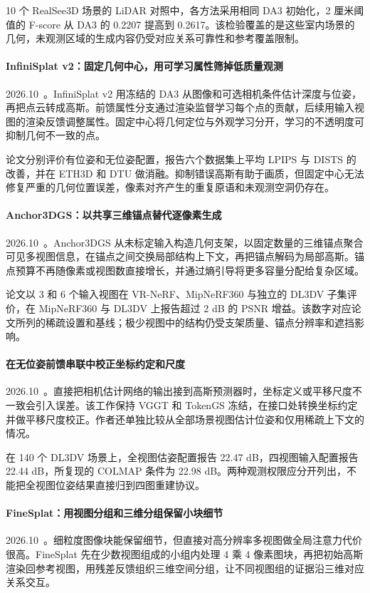 10 个 RealSee3D 场景的 LiDAR 对照中，各方法采用相同 DA3 初始化，2 厘米阈值的 F-score 从 DA3 的 0.2207 提高到 0.2617。该检验覆盖的是这些室内场景的几何，未观测区域的生成内容仍受对应关系可靠性和参考覆盖限制。

\paragraph{InfiniSplat v2：固定几何中心，用可学习属性筛掉低质量观测}
2026.10~\cite{2610_20341}。InfiniSplat v2 用冻结的 DA3 从图像和可选相机条件估计深度与位姿，再把点云转成高斯。前馈属性分支通过渲染监督学习每个点的贡献，后续用输入视图的渲染反馈调整属性。固定中心将几何定位与外观学习分开，学习的不透明度可抑制几何不一致的点。

论文分别评价有位姿和无位姿配置，报告六个数据集上平均 LPIPS 与 DISTS 的改善，并在 ETH3D 和 DTU 做消融。抑制错误高斯有助于画质，但固定中心无法修复严重的几何位置误差，像素对齐产生的重复原语和未观测空洞仍存在。

\paragraph{Anchor3DGS：以共享三维锚点替代逐像素生成}
2026.10~\cite{2610_21634}。Anchor3DGS 从未标定输入构造几何支架，以固定数量的三维锚点聚合可见多视图信息，在锚点之间交换局部结构上下文，再把锚点解码为局部高斯。锚点预算不再随像素或视图数直接增长，并通过熵引导将更多容量分配给复杂区域。

论文以 3 和 6 个输入视图在 VR-NeRF、MipNeRF360 与独立的 DL3DV 子集评价，在 MipNeRF360 与 DL3DV 上报告超过 2 dB 的 PSNR 增益。该数字对应论文所列的稀疏设置和基线；极少视图中的结构仍受支架质量、锚点分辨率和遮挡影响。

\paragraph{在无位姿前馈串联中校正坐标约定和尺度}
2026.10~\cite{2610_23039}。直接把相机估计网络的输出接到高斯预测器时，坐标定义或平移尺度不一致会引入误差。该工作保持 VGGT 和 TokenGS 冻结，在接口处转换坐标约定并做平移尺度校正。作者还单独比较从全部场景视图估计位姿和仅用稀疏上下文的情况。

在 140 个 DL3DV 场景上，全视图估姿配置报告 22.47 dB，四视图输入配置报告 22.44 dB，所复现的 COLMAP 条件为 22.98 dB。两种观测权限应分开列出，不能把全视图位姿结果直接归到四图重建协议。

\paragraph{FineSplat：用视图分组和三维分组保留小块细节}
2026.10~\cite{2610_25011}。细粒度图像块能保留细节，但直接对高分辨率多视图做全局注意力代价很高。FineSplat 先在少数视图组成的小组内处理 4 乘 4 像素图块，再把初始高斯渲染回参考视图，用残差反馈组织三维空间分组，让不同视图组的证据沿三维对应关系交互。

